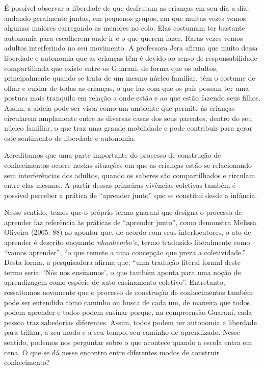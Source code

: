 É possível observar a liberdade de que desfrutam as crianças em seu dia a
dia, andando geralmente juntas, em pequenos grupos, em que muitas vezes
vemos algumas maiores carregando as menores no colo. Elas costumam ter
bastante autonomia para escolherem onde ir e o que querem fazer. Raras
vezes vemos adultos interferindo no seu movimento. A professora Jera
afirma que muito dessa liberdade e autonomia que as crianças têm é
devido ao senso de responsabilidade compartilhada que existe entre os
Guarani, de forma que os adultos, principalmente quando se trata de um
mesmo núcleo familiar, têm o costume de olhar e cuidar de todas as
crianças, o que faz com que os pais possam ter uma postura mais
tranquila em relação a onde estão e ao que estão fazendo seus filhos.
Assim, a aldeia pode ser vista como um ambiente que permite às crianças
circularem amplamente entre as diversas casas dos seus parentes, dentro
do seu núcleo familiar, o que traz uma grande mobilidade e pode
contribuir para gerar este sentimento de liberdade e autonomia. 

Acreditamos que uma parte importante do processo de construção de
conhecimentos ocorre nestas situações em que as crianças estão se
relacionando sem interferências dos adultos, quando os saberes são
compartilhados e circulam entre elas mesmas. A partir dessas primeiras
vivências coletivas também é possível perceber a prática de ``aprender
junto'' que se constitui desde a infância.

Nesse sentido, temos que o próprio termo guarani que designa o processo
de aprender faz referência às práticas de ``aprender junto'', como
demonstra  Melissa Oliveira (2005: 88) ao apontar que, de acordo com
seus interlocutores, o ato de aprender é descrito enquanto \emph{nhanhembo’e},
termo traduzido literalmente como ``vamos aprender'', ``o que remete a uma
concepção que preza a coletividade.'' Desta forma, a pesquisadora afirma
que: ``uma tradução literal formal deste termo seria: ‘Nós nos
ensinamos’, o que também aponta para uma noção de aprendizagem como
espécie de auto-ensinamento coletivo''. Entretanto, ressaltamos
novamente que o processo de construção de conhecimentos também pode ser
entendido como caminho ou busca de cada um, de maneira que todos podem
aprender e todos podem ensinar porque, na compreensão Guarani, cada
pessoa traz sabedorias diferentes. Assim, todos podem ter autonomia e
liberdade para trilhar, a seu modo e a seu tempo, seu caminho de
aprendizado. Nesse sentido, podemos nos perguntar sobre o que acontece
quando a escola entra em cena. O que se dá nesse encontro entre
diferentes modos de construir conhecimento?

